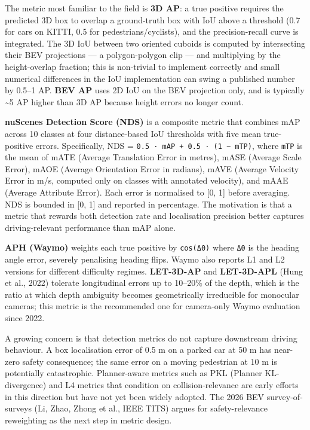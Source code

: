 The metric most familiar to the field is \textbf{3D AP}: a true positive requires the predicted 3D box to overlap a ground-truth box with IoU above a threshold (0.7 for cars on KITTI, 0.5 for pedestrians/cyclists), and the precision-recall curve is integrated. The 3D IoU between two oriented cuboids is computed by intersecting their BEV projections --- a polygon-polygon clip --- and multiplying by the height-overlap fraction; this is non-trivial to implement correctly and small numerical differences in the IoU implementation can swing a published number by 0.5--1 AP. \textbf{BEV AP} uses 2D IoU on the BEV projection only, and is typically \textasciitilde5 AP higher than 3D AP because height errors no longer count.

\textbf{nuScenes Detection Score (NDS)} is a composite metric that combines mAP across 10 classes at four distance-based IoU thresholds with five mean true-positive errors. Specifically, NDS = \texttt{0.5\ ·\ mAP\ +\ 0.5\ ·\ (1\ −\ mTP)}, where \texttt{mTP} is the mean of mATE (Average Translation Error in metres), mASE (Average Scale Error), mAOE (Average Orientation Error in radians), mAVE (Average Velocity Error in m/s, computed only on classes with annotated velocity), and mAAE (Average Attribute Error). Each error is normalised to {[}0, 1{]} before averaging. NDS is bounded in {[}0, 1{]} and reported in percentage. The motivation is that a metric that rewards both detection rate and localisation precision better captures driving-relevant performance than mAP alone.

\textbf{APH (Waymo)} weights each true positive by \texttt{\textbar{}cos(Δθ)\textbar{}} where \texttt{Δθ} is the heading angle error, severely penalising heading flips. Waymo also reports L1 and L2 versions for different difficulty regimes. \textbf{LET-3D-AP} and \textbf{LET-3D-APL} (Hung et al., 2022) tolerate longitudinal errors up to 10--20\% of the depth, which is the ratio at which depth ambiguity becomes geometrically irreducible for monocular cameras; this metric is the recommended one for camera-only Waymo evaluation since 2022.

A growing concern is that detection metrics do not capture downstream driving behaviour. A box localisation error of 0.5 m on a parked car at 50 m has near-zero safety consequence; the same error on a moving pedestrian at 10 m is potentially catastrophic. Planner-aware metrics such as PKL (Planner KL-divergence) and L4 metrics that condition on collision-relevance are early efforts in this direction but have not yet been widely adopted. The 2026 BEV survey-of-surveys (Li, Zhao, Zhong et al., IEEE TITS) argues for safety-relevance reweighting as the next step in metric design.

